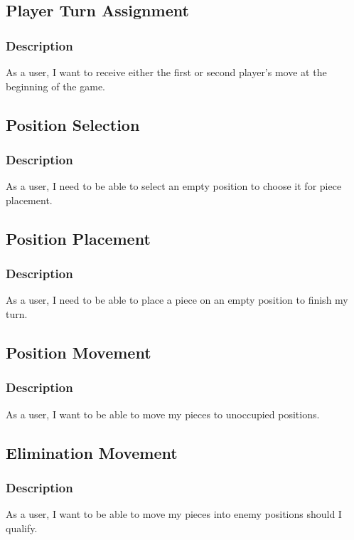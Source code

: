 \documentclass[11pt]{article}
\begin{document}
\subsection{Player Turn Assignment}
\label{sec:org9d7b481}
\subsubsection*{Description}
\label{sec:org3c3c46a}
As a user, I want to receive either the first or second player's move at the beginning of the game.
\subsection{Position Selection}
\label{sec:orga007189}
\subsubsection*{Description}
\label{sec:orgdfb5e53}
As a user, I need to be able to select an empty position to choose it for piece placement.

\subsection{Position Placement}
\label{sec:org48981c8}
\subsubsection*{Description}
\label{sec:orgfced166}
As a user, I need to be able to place a piece on an empty position to finish my turn.

\subsection{Position Movement}
\label{sec:orge12bdd0}
\subsubsection*{Description}
\label{sec:org5f16ed5}
As a user, I want to be able to move my pieces to unoccupied positions.

\subsection{Elimination Movement}
\label{sec:org60852b8}
\subsubsection*{Description}
\label{sec:org189becd}
As a user, I want to be able to move my pieces into enemy positions should I qualify.
\end{document}
